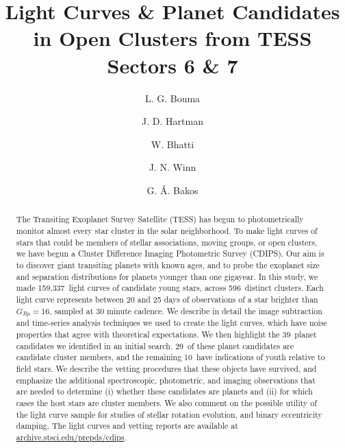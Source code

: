 \documentclass[12pt,twocolumn,tighten]{aastex62}
\newcommand{\numberpcs}{39\ }  %
\newcommand{\numberzaripcs}{10\ }  %
\newcommand{\numberclusterpcs}{29\ }  %
\newcommand{\numberlcs}{159{,}337\ } %
\newcommand{\numberclusters}{596\ } %
\newcommand{\stscilink}{\url{archive.stsci.edu/prepds/cdips}}
\begin{document}
\title{
  Light Curves \& Planet Candidates in Open Clusters from TESS Sectors 6 \& 7
}


\author[0000-0002-0514-5538]{L. G. Bouma}
%
\author[0000-0001-8732-6166]{J. D. Hartman}
%
\author[0000-0002-0628-0088]{W. Bhatti}
%
\author[0000-0002-4265-047X]{J. N. Winn}
%
\author[0000-0001-7204-6727]{G. \'A. Bakos}

\begin{abstract}
  The Transiting Exoplanet Survey Satellite (TESS) has begun to
  photometrically monitor almost every star cluster in
  the solar neighborhood.
  To make light curves of stars that could be members of stellar
  associations, moving groups, or open clusters, we have begun a
  Cluster Difference Imaging Photometric Survey (CDIPS).
  Our aim is to discover giant transiting planets with known
  ages, and to probe the exoplanet size and separation distributions for
  planets younger than one gigayear.
  In this study, we made \numberlcs light curves of candidate young
  stars, across \numberclusters distinct clusters.
  Each light curve represents between 20 and 25 days of observations
  of a star brighter than $G_{Rp}=16$, sampled at 30 minute cadence.
  We describe in detail the image subtraction and time-series analysis 
  techniques we used to create the light curves, which
  have noise properties that agree with theoretical expectations.
  We then highlight the \numberpcs planet candidates we identified in
  an initial search.
  \numberclusterpcs of these planet candidates are candidate cluster
  members, and the remaining \numberzaripcs have indications of youth
  relative to field stars.
  We describe the vetting procedures that these objects have survived,
  and emphasize the additional spectroscopic, photometric, and imaging
  observations that are needed to determine (i) whether these candidates
  are planets and (ii) for which cases the host stars are cluster members.
  We also comment on the possible utility of the light curve sample for
  studies of stellar rotation evolution, and binary eccentricity
  damping.
  The light curves and vetting reports are available at
  \stscilink.
\end{abstract}
\end{document}
